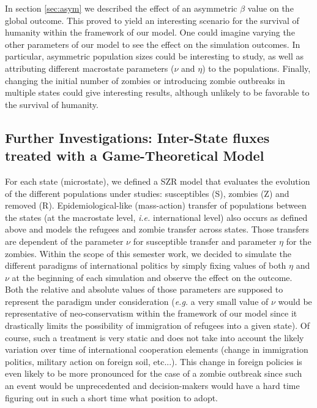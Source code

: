 \documentclass[11pt]{article} %
\begin{document}
In section \ref{sec:asym} we described the effect of an asymmetric $\beta$ value on the global outcome. This proved to yield an interesting scenario for the survival of humanity within the framework of our model. One could imagine varying the other parameters of our model to see the effect on the simulation outcomes. In particular, asymmetric population sizes could be interesting to study, as well as attributing different macrostate parameters ($\nu$ and $\eta$) to the populations. Finally, changing the initial number of zombies or introducing zombie outbreaks in multiple states could give interesting results, although unlikely to be favorable to the survival of humanity.

\subsection{Further Investigations: Inter-State fluxes treated with a Game-Theoretical Model}\indent
\label{sec:gt}

For each state (microstate), we defined a SZR model that evaluates the evolution of the different populations under studies: susceptibles (S), zombies (Z) and removed (R). Epidemiological-like (mass-action) transfer of populations between the states (at the macrostate level, \textit{i.e.} international level) also occurs as defined above and models the refugees and zombie transfer across states. Those transfers are dependent of the parameter $\nu$ for susceptible transfer and parameter $\eta$ for the zombies. Within the scope of this semester work, we decided to simulate the different paradigms of international politics by simply fixing values of both $\eta$ and $\nu$ at the beginning of each simulation and observe the effect on the outcome. Both the relative and absolute values of those parameters are supposed to represent the paradigm under consideration (\textit{e.g.} a very small value of $\nu$ would be representative of neo-conservatism within the framework of our model since it drastically limits the possibility of immigration of refugees into a given state). Of course, such a treatment is very static and does not take into account the likely variation over time of  international cooperation elements (change in immigration politics, military action on foreign soil, etc...). This change in foreign policies is even likely to be more pronounced for the case of a zombie outbreak since such an event would be unprecedented and decision-makers would have a hard time figuring out in such a short time what position to adopt. 
\end{document}
